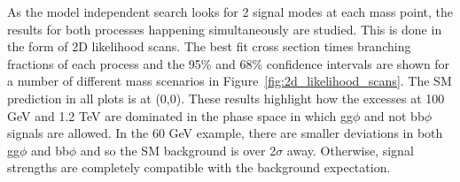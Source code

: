 As the model independent search looks for 2 signal modes at each mass point, the results for both processes happening simultaneously are studied.
This is done in the form of 2D likelihood scans.
The best fit cross section times branching fractions of each process and the 95\% and 68\% confidence intervals are shown for a number of different mass scenarios in Figure~\ref{fig:2d_likelihood_scans}.
The SM prediction in all plots is at (0,0).
These results highlight how the excesses at 100 GeV and 1.2 TeV are dominated in the phase space in which gg$\phi$ and not bb$\phi$ signals are allowed.
In the 60 GeV example, there are smaller deviations in both gg$\phi$ and bb$\phi$ and so the SM background is over 2$\sigma$ away.
Otherwise, signal strengths are completely compatible with the background expectation.


\begin{figure}[!hbtp]
\centering
     \\

\end{figure}
